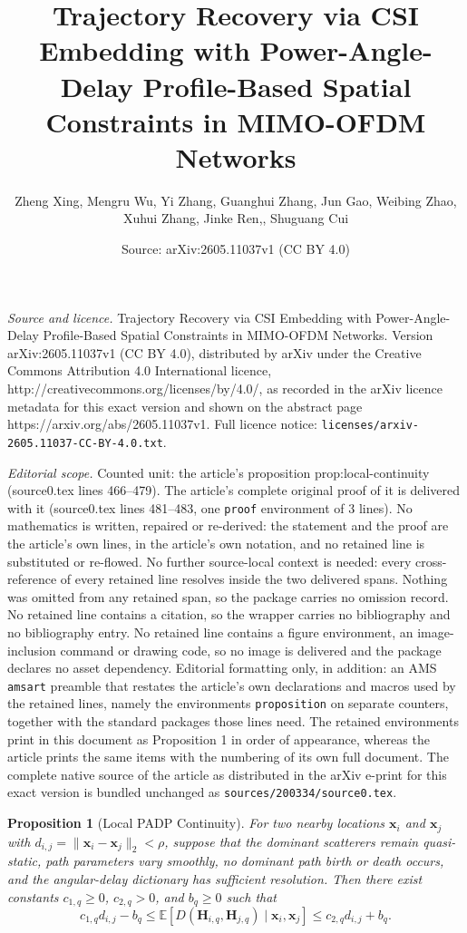 \documentclass[10pt,a4paper]{amsart}
\title{Trajectory Recovery via CSI Embedding with Power-Angle-Delay Profile-Based Spatial Constraints in MIMO-OFDM Networks}
\author{Zheng Xing, Mengru Wu, Yi Zhang, Guanghui Zhang, Jun Gao, Weibing Zhao, Xuhui Zhang, Jinke Ren,, Shuguang Cui}
\date{Source: arXiv:2605.11037v1 (CC BY 4.0)}
\newtheorem{proposition}{Proposition}
\begin{document}
\maketitle

\noindent\emph{Source and licence.} Trajectory Recovery via CSI Embedding with Power-Angle-Delay Profile-Based Spatial Constraints in MIMO-OFDM Networks. Version arXiv:2605.11037v1 (CC BY 4.0), distributed by arXiv under the Creative Commons Attribution 4.0 International licence, http://creativecommons.org/licenses/by/4.0/, as recorded in the arXiv licence metadata for this exact version and shown on the abstract page https://arxiv.org/abs/2605.11037v1. Full licence notice: \texttt{licenses/arxiv-2605.11037-CC-BY-4.0.txt}.\par\smallskip

\noindent\textit{Editorial scope.} Counted unit: the article's proposition prop:local-continuity (source0.tex lines 466--479). The article's complete original proof of it is delivered with it (source0.tex lines 481--483, one \texttt{proof} environment of 3 lines). No mathematics is written, repaired or re-derived: the statement and the proof are the article's own lines, in the article's own notation, and no retained line is substituted or re-flowed.  No further source-local context is needed: every cross-reference of every retained line resolves inside the two delivered spans.  Nothing was omitted from any retained span, so the package carries no omission record.  No retained line contains a citation, so the wrapper carries no bibliography and no bibliography entry.  No retained line contains a figure environment, an image-inclusion command or drawing code, so no image is delivered and the package declares no asset dependency.  Editorial formatting only, in addition: an AMS \texttt{amsart} preamble that restates the article's own declarations and macros used by the retained lines, namely the environments \texttt{proposition} on separate counters, together with the standard packages those lines need.  The retained environments print in this document as Proposition 1 in order of appearance, whereas the article prints the same items with the numbering of its own full document.  The complete native source of the article as distributed in the arXiv e-print for this exact version is bundled unchanged as \texttt{sources/200334/source0.tex}.
\begin{proposition}[Local PADP Continuity]
	\label{prop:local-continuity}
	For two nearby locations \(\mathbf{x}_i\) and \(\mathbf{x}_j\) with \(d_{i,j}=\|\mathbf{x}_i-\mathbf{x}_j\|_2<\rho\), suppose that the dominant scatterers remain quasi-static, path parameters vary smoothly, no dominant path birth or death occurs, and the angular-delay dictionary has sufficient resolution. Then there exist constants \(c_{1,q}\geq0\), \(c_{2,q}>0\), and \(b_q\geq0\) such that
$$c_{1,q}d_{i,j}-b_q
\leq
\mathbb{E}
\!\left[
D(\mathbf{H}_{i,q},\mathbf{H}_{j,q})
\mid
\mathbf{x}_i,\mathbf{x}_j
\right]
\leq
c_{2,q}d_{i,j}+b_q.$$
\end{proposition}
\end{document}
